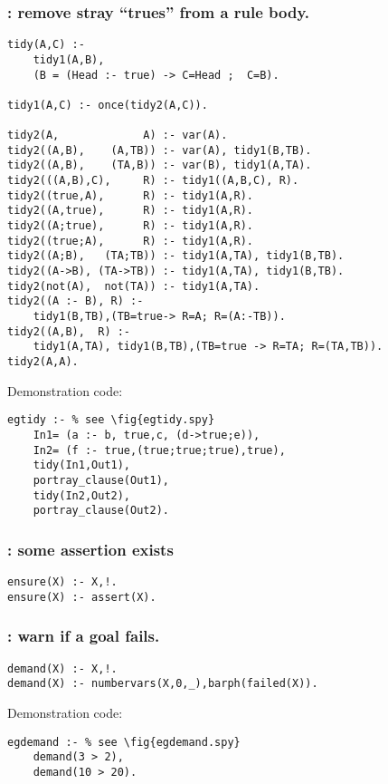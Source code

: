 \subsubsection{ : remove stray ``trues'' from a rule body. 
}
\label{sec:tidy/2}
\begin{Verbatim}
tidy(A,C) :-
    tidy1(A,B),
    (B = (Head :- true) -> C=Head ;  C=B).

tidy1(A,C) :- once(tidy2(A,C)).

tidy2(A,             A) :- var(A). 
tidy2((A,B),    (A,TB)) :- var(A), tidy1(B,TB).
tidy2((A,B),    (TA,B)) :- var(B), tidy1(A,TA).
tidy2(((A,B),C),     R) :- tidy1((A,B,C), R).
tidy2((true,A),      R) :- tidy1(A,R).
tidy2((A,true),      R) :- tidy1(A,R).
tidy2((A;true),      R) :- tidy1(A,R).
tidy2((true;A),      R) :- tidy1(A,R).
tidy2((A;B),   (TA;TB)) :- tidy1(A,TA), tidy1(B,TB).
tidy2((A->B), (TA->TB)) :- tidy1(A,TA), tidy1(B,TB).
tidy2(not(A),  not(TA)) :- tidy1(A,TA).
tidy2((A :- B), R) :-
    tidy1(B,TB),(TB=true-> R=A; R=(A:-TB)).
tidy2((A,B),  R) :-
    tidy1(A,TA), tidy1(B,TB),(TB=true -> R=TA; R=(TA,TB)).
tidy2(A,A).
\end{Verbatim}
Demonstration code:
\begin{Verbatim}
egtidy :- % see \fig{egtidy.spy}
    In1= (a :- b, true,c, (d->true;e)),
    In2= (f :- true,(true;true;true),true),
    tidy(In1,Out1),
    portray_clause(Out1),
    tidy(In2,Out2),
    portray_clause(Out2).
\end{Verbatim}
\subsubsection{ : some assertion exists
}
\label{sec:ensure/1}
\begin{Verbatim}
ensure(X) :- X,!.
ensure(X) :- assert(X).
\end{Verbatim}
\subsubsection{ : warn if a goal fails. 
}
\label{sec:demand/1}
\begin{Verbatim}
demand(X) :- X,!.
demand(X) :- numbervars(X,0,_),barph(failed(X)).
\end{Verbatim}
Demonstration code:
\begin{Verbatim}
egdemand :- % see \fig{egdemand.spy}
    demand(3 > 2),
    demand(10 > 20).
\end{Verbatim}
